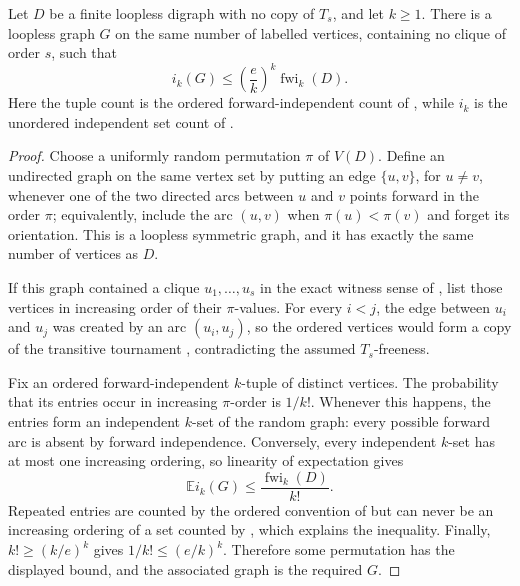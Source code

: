 \begin{lemma}
Let $D$ be a finite loopless digraph with no copy of $T_s$, and let $k\geq
1$.  There is a loopless graph $G$ on the same number of labelled vertices,
containing no clique of order $s$, such that
\[
 i_k(G)\leq \left(\frac{e}{k}\right)^k\operatorname{fwi}_k(D).
\]
Here the tuple count is the ordered forward-independent count of
, while $i_k$ is the unordered independent
set count of .
\end{lemma}
\begin{proof}
Choose a uniformly random permutation $\pi$ of $V(D)$.  Define an undirected
graph on the same vertex set by putting an edge $\{u,v\}$, for $u\ne v$,
whenever one of the two directed arcs between $u$ and $v$ points forward in
the order $\pi$; equivalently, include the arc $(u,v)$ when
$\pi(u)<\pi(v)$ and forget its orientation.  This is a loopless symmetric
graph, and it has exactly the same number of vertices as $D$.

If this graph contained a clique $u_1,\ldots,u_s$ in the exact witness sense
of , list those vertices in increasing order of their
$\pi$-values.  For every $i<j$, the edge between $u_i$ and $u_j$ was created by
an arc $(u_i,u_j)$, so the ordered vertices would form a copy of the
transitive tournament , contradicting the
assumed $T_s$-freeness.

Fix an ordered forward-independent $k$-tuple of distinct vertices.  The
probability that its entries occur in increasing $\pi$-order is $1/k!$.
Whenever this happens, the entries form an independent $k$-set of the
random graph: every possible forward arc is absent by forward independence.
Conversely, every independent $k$-set has at most one increasing ordering,
so linearity of expectation gives
\[
 \mathbb E i_k(G)\leq \frac{\operatorname{fwi}_k(D)}{k!}.
\]
Repeated entries are counted by the ordered convention of
 but can never be an increasing ordering of
a set counted by , which explains the inequality.
Finally,
$k!\geq(k/e)^k$ gives $1/k!\leq(e/k)^k$.  Therefore some permutation has
the displayed bound, and the associated graph is the required $G$.
\end{proof}
